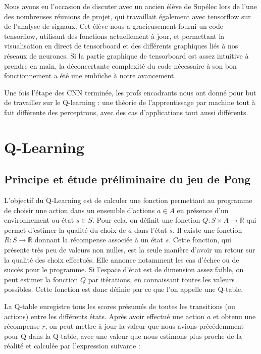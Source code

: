 \documentclass[
    10pt,
    a4paper,
    oneside,
    headinclude,footinclude,
    BCOR=5mm,
    captions=tableabove
]{scrartcl}
\begin{document}
Nous avons eu l'occasion de discuter avec un ancien élève de Supélec lors de l'une des nombreuses réunions de projet, qui travaillait également avec tensorflow sur de l'analyse de signaux. Cet élève nous a gracieusement fourni un code tensorflow, utilisant des fonctions actuellement à jour, et permettant la visualisation en direct de tensorboard et des différents graphiques liés à nos réseaux de neurones. Si la partie graphique de tensorboard est assez intuitive à prendre en main, la déconcertante complexité du code nécessaire à son bon fonctionnement a été une embûche à notre avancement.

Une fois l'étape des CNN terminée, les profs encadrants nous ont donné pour but de travailler sur le Q-learning : une théorie de l'apprentissage par machine tout à fait différente des perceptrons, avec des cas d'applications tout aussi différents.

\newpage
\section{Q-Learning}
\subsection{Principe et étude préliminaire du jeu de Pong}
L'objectif du Q-Learning est de calculer une fonction permettant au programme de choisir une action dans un ensemble d'actions $a \in A$ en présence d'un environnement ou état $s \in S$. Pour cela, on définit une fonction $Q: S \times A \rightarrow \mathbb{R}$ qui permet d'estimer la qualité du choix de $a$ dans l'état $s$. Il existe une fonction $R: S \rightarrow \mathbb{R}$ donnant la récompense associée à un état $s$. Cette fonction, qui présente très peu de valeurs non nulles, est la seule manière d'avoir un retour sur la qualité des choix effectués. Elle annonce notamment les cas d'échec ou de succès pour le programme. Si l'espace d'état est de dimension assez faible, on peut estimer la fonction $Q$ par itérations, en connaissant toutes les valeurs possibles. Cette fonction est donc définie par ce que l'on appelle une Q-table.

La Q-table enregistre tous les scores présumés de toutes les transitions (ou actions) entre les différents états. Après avoir effectué une action $a$ et obtenu une récompense $r$, on peut mettre à jour la valeur que nous avions précédemment pour Q dans la Q-table, avec une valeur que nous estimons plus proche de la réalité et calculée par l'expression suivante :
\end{document}
